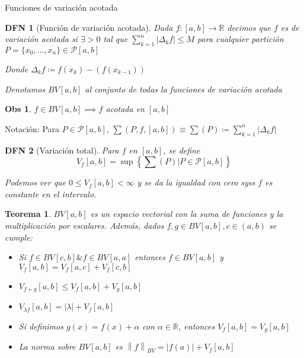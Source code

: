 \documentclass[a4paper]{article}\usepackage{/home/alonso/Documents/Projects/formularios/styles}
\newtheorem{definition}{DFN}
\theoremstyle{mytheoremstyle}
\newtheorem{theorem}{Teorema}
\newtheorem*{obs}{Obs}
\newcommand{\R}{\mathbb{R}}
\newcommand{\1}{\mathds{1}}
\newcommand{\norm}[1]{\left\|#1\right\|}
\begin{document}
\begin{multicols*}{3}
\columnbreak

\begin{roundbox}{Funciones de variación acotada}
	\begin{definition}[Función de variación acotada]
		Dada $ f : [a,b] \to \R  $ decimos que $ f $ es de variación acotada si $ \exists > 0 $ tal que $ \sum_{k=1}^{n} |\Delta_k f| \leq M $ para cualquier partición $ P = \{ x_0, \ldots, x_n \} \in \mathcal{P}[a,b] $

		Donde $ \Delta_k f \coloneqq f(x_k) - (f(x_{k-1})) $

		Denotamos $ BV[a,b] $ al conjunto de todas la funciones de variación acotada
	\end{definition}

	\begin{obs}
		$ f \in BV[a,b] \implies f $ acotada en $ [a,b] $
	\end{obs}

	Notación: Para $ P \in \mathcal{P} [a,b]$, $ \sum (P,f,[a,b]) \equiv \sum (P) \coloneqq \sum_{k=1}^{n} |\Delta_k f|  $

	\begin{definition}[Variación total]
		Para $ f  $ en $ [a,b] $, se define
		\[
			V_f [a,b] = \sup \left\{ \sum(P) \left| P \in \mathcal{P}[a,b] \right. \right\}
		\]

		Podemos ver que $ 0 \leq V_f [a,b] < \infty $ y se da la igualdad con cero syss $ f $ es constante en el intervalo.
	\end{definition}

	\begin{theorem}
		$ BV[a,b] $ es un espacio vectorial con la suma de funciones y la multiplicación por escalares.
		Además, dados $ f, g \in BV[a,b], c \in (a,b) $ se cumple:
		\begin{itemize}
			\item Si $ f \in BV[c,b] \& f\in BV[a,a] $ entonces $ f \in BV[a,b] $ y $ V_f [a,b] = V_f [a,c] + V_f [c,b] $
			\item $ V_{f+g} [a,b] \leq V_f [a,b] + V_g [a,b] $
			\item $ V_{\lambda f} [a,b] =  |\lambda| + V_f [a,b] $
			\item Si definimos $ g(x) = f(x) + \alpha $ con $ \alpha \in \mathbb{R} $, entonces $ V_f[a,b] = V_g[a,b] $
			\item La norma sobre $ BV[a,b] $ es $ \norm{f}_{BV} = |f(a)| + V_f [a,b] $
		\end{itemize}
	\end{theorem}


\end{roundbox}
\end{multicols*}
\end{document}
